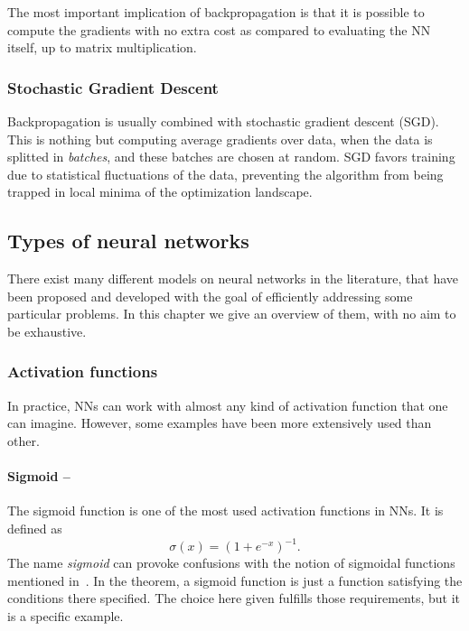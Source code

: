 \documentclass[]{report}
\begin{document}
The most important implication of backpropagation is that it is possible to compute the gradients with no extra cost as compared to evaluating the NN itself, up to matrix multiplication. 

\subsubsection{Stochastic Gradient Descent}

Backpropagation is usually combined with stochastic gradient descent (SGD). This is nothing but computing average gradients over data, when the data is splitted in \textit{batches}, and these batches are chosen at random. SGD favors training due to statistical fluctuations of the data, preventing the algorithm from being trapped in local minima of the optimization landscape. 

\subsection{Types of neural networks}

There exist many different models on neural networks in the literature, that have been proposed and developed with the goal of efficiently addressing some particular problems. In this chapter we give an overview of them, with no aim to be exhaustive. 

\subsubsection{Activation functions}

In practice, NNs can work with almost any kind of activation function that one can imagine. However, some examples have been more extensively used than other. 

\paragraph{Sigmoid --} The sigmoid function is one of the most used activation functions in NNs. It is defined as
\begin{equation}
\sigma(x) = (1 + e^{-x})^{-1}.
\end{equation}
The name \textit{sigmoid} can provoke confusions with the notion of sigmoidal functions mentioned in~. In the theorem, a sigmoid function is just a function satisfying the conditions there specified. The choice here given fulfills those requirements, but it is a specific example. 
\end{document}
